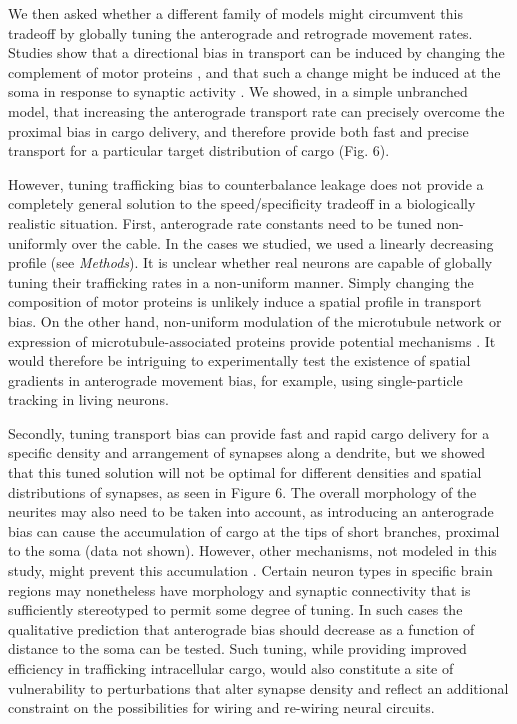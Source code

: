 \documentclass[11pt]{wlpeerj}
\begin{document}
We then asked whether a different family of models might circumvent this tradeoff by globally tuning the anterograde and retrograde movement rates. Studies show that a directional bias in transport can be induced by changing the complement of motor proteins \citep{Kanai2004,Amrute2012}, and that such a change might be induced at the soma in response to synaptic activity \citep{Puthanveettil_2008}. We showed, in a simple unbranched model, that increasing the anterograde transport rate can precisely overcome the proximal bias in cargo delivery, and therefore provide both fast and precise transport for a particular target distribution of cargo (Fig. 6).

However, tuning trafficking bias to counterbalance leakage does not provide a completely general solution to the speed/specificity tradeoff in a biologically realistic situation. First, anterograde rate constants need to be tuned non-uniformly over the cable. In the cases we studied, we used a linearly decreasing profile (see \textit{Methods}). It is unclear whether real neurons are capable of globally tuning their trafficking rates in a non-uniform manner. Simply changing the composition of motor proteins \citep{Amrute2012} is unlikely induce a spatial profile in transport bias. On the other hand, non-uniform modulation of the microtubule network or expression of microtubule-associated proteins provide potential mechanisms \citep{Kwan2008,Soundararajan_2014}. It would therefore be intriguing to experimentally test the existence of spatial gradients in anterograde movement bias, for example, using single-particle tracking in living neurons.

Secondly, tuning transport bias can provide fast and rapid cargo delivery for a specific density and arrangement of synapses along a dendrite, but we showed that this tuned solution will not be optimal for different densities and spatial distributions of synapses, as seen in Figure 6. The overall morphology of the neurites may also need to be taken into account, as introducing an anterograde bias can cause the accumulation of cargo at the tips of short branches, proximal to the soma (data not shown). However, other mechanisms, not modeled in this study, might prevent this accumulation \citep{Soundararajan_2014}. Certain neuron types in specific brain regions may nonetheless have morphology and synaptic connectivity that is sufficiently stereotyped to permit some degree of tuning. In such cases the qualitative prediction that anterograde bias should decrease as a function of distance to the soma can be tested. Such tuning, while providing improved efficiency in trafficking intracellular cargo, would also constitute a site of vulnerability to perturbations that alter synapse density and reflect an additional constraint on the possibilities for wiring and re-wiring neural circuits.
\end{document}
